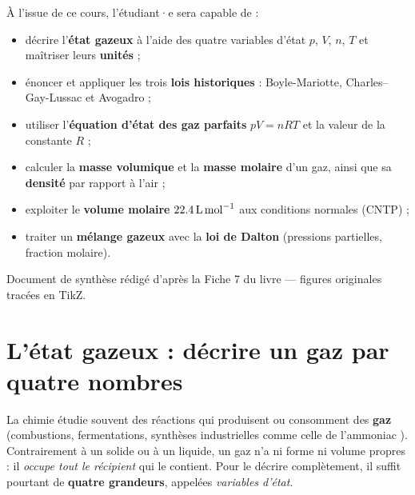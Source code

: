 \documentclass[11pt,a4paper]{article}
\newcommand{\GP}{gaz parfaits}
\begin{document}
\vspace{0.2cm}

\begin{tcolorbox}[boxbase,colback=primary!5,colframe=primary,width=15cm,
    title={\textsc{Objectifs pédagogiques de la fiche}}]
À l'issue de ce cours, l'étudiant·e sera capable de :
\begin{itemize}[leftmargin=1.6em,topsep=2pt,itemsep=1pt]
  \item décrire l'\textbf{état gazeux} à l'aide des quatre variables d'état $p$, $V$, $n$, $T$ et maîtriser leurs \textbf{unités} ;
  \item énoncer et appliquer les trois \textbf{lois historiques} : Boyle-Mariotte, Charles--Gay-Lussac et Avogadro ;
  \item utiliser l'\textbf{équation d'état des \GP} $pV=nRT$ et la valeur de la constante $R$ ;
  \item calculer la \textbf{masse volumique} et la \textbf{masse molaire} d'un gaz, ainsi que sa \textbf{densité} par rapport à l'air ;
  \item exploiter le \textbf{volume molaire} $\qty{22{,}4}{\litre\per\mole}$ aux conditions normales (CNTP) ;
  \item traiter un \textbf{mélange gazeux} avec la \textbf{loi de Dalton} (pressions partielles, fraction molaire).
\end{itemize}
\end{tcolorbox}

\vspace{0.4cm}
{\small\color{black!60} Document de synthèse rédigé d'après la Fiche 7 du livre — figures originales tracées en TikZ.}
\par
\endgroup

\newpage
\renewcommand{\contentsname}{\textcolor{primarydark}{Table des matières}}
\tableofcontents
\thispagestyle{fancy}
\newpage

\section{L'état gazeux : décrire un gaz par quatre nombres}
La chimie étudie souvent des réactions qui produisent ou consomment des \textbf{gaz} (combustions,
fermentations, synthèses industrielles comme celle de l'ammoniac ). Contrairement à un solide
ou à un liquide, un gaz n'a ni forme ni volume propres : il \emph{occupe tout le récipient} qui le
contient. Pour le décrire complètement, il suffit pourtant de \textbf{quatre grandeurs}, appelées
\emph{variables d'état}.
\end{document}
